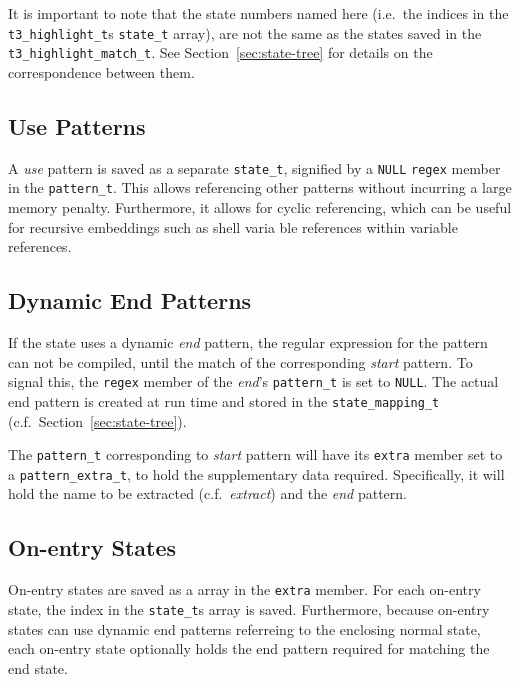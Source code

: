 \documentclass[a4paper]{article}
\begin{document}
\begin{multicols}{2}
It is important to note that the state numbers named here (i.e.\ the indices in
the {\tt t3_highlight_t}s {\tt state_t} array), are not the same as the states
saved in the {\tt t3_highlight_match_t}. See Section~\ref{sec:state-tree} for
details on the correspondence between them.


\subsection{Use Patterns}
A {\it use} pattern is saved as a separate {\tt state_t}, signified by a
{\tt NULL} {\tt regex} member in the {\tt pattern_t}\footnotemark[1]. This
allows referencing other patterns without incurring a large memory penalty.
Furthermore, it allows for cyclic referencing, which can be useful for
recursive embeddings such as shell varia ble references within variable
references.

\subsection{Dynamic End Patterns}
If the state uses a dynamic {\it end} pattern, the regular expression for the
pattern can not be compiled, until the match of the corresponding {\it start}
pattern. To signal this, the {\tt regex} member of the {\it end}'s
{\tt pattern_t} is set to {\tt NULL}\footnotemark[1]. The actual end pattern is
created at run time and stored in the {\tt state_mapping_t}
(c.f.\ Section~\ref{sec:state-tree}).


The {\tt pattern_t} corresponding to {\it start} pattern will have its
{\tt extra} member set to a {\tt pattern_extra_t}, to hold the supplementary
data required\footnotemark[2]. Specifically, it will hold the name to be
extracted (c.f.\ {\it extract}) and the {\it end} pattern.

\subsection{On-entry States}
On-entry states are saved as a array in the {\tt extra} member\footnotemark[2].
For each on-entry state, the index in the {\tt state_t}s array is saved.
Furthermore, because on-entry states can use dynamic end patterns referreing to
the enclosing normal state, each on-entry state optionally holds the end
pattern required for matching the end state.


\end{multicols}
\end{document}
